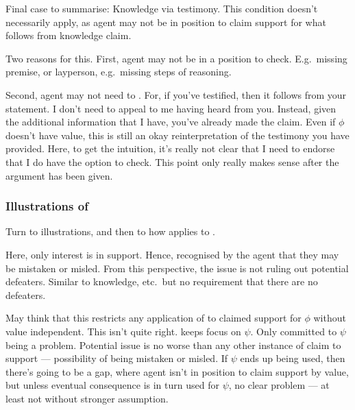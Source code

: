 \begin{note}
  Final case to summarise:
  Knowledge via testimony.
  This condition doesn't necessarily apply, as agent may not be in position to claim support for what follows from knowledge claim.

  Two reasons for this.
  First, agent may not be in a position to check.
  E.g.\ missing premise, or layperson, e.g.\ missing steps of reasoning.

  Second, agent may not need to \RBV{-}.
  For, if you've testified, then it follows from your statement.
  I don't need to appeal to me having heard from you.
  Instead, given the additional information that I have, you've already made the claim.
  Even if \(\phi\) doesn't have value, this is still an okay reinterpretation of the testimony you have provided.
  Here, to get the intuition, it's really not clear that I need to endorse that I do have the option to check.
  {
    \color{red}
    This point only really makes sense after the argument has been given.
  }
\end{note}

\subsubsection{Illustrations of \nI{}}
\label{sec:illustrations-ni}

\begin{note}
  Turn to illustrations, and then to how \nI{} applies to \gsi{}.
\end{note}

\begin{note}
  Here, only interest is in support.
  Hence, recognised by the agent that they may be mistaken or misled.
  From this perspective, the issue is not ruling out potential defeaters.
  Similar to knowledge, etc.\ but no requirement that there are no defeaters.
\end{note}

\begin{note}
  May think that this restricts any application of \RBV{} to claimed support for \(\phi\) without value independent.
  This isn't quite right.
  \eiS{} keeps focus on \(\psi\).
  Only committed to \(\psi\) being a problem.
  Potential issue is no worse than any other instance of claim to support --- possibility of being mistaken or misled.
  If \(\psi\) ends up being used, then there's going to be a gap, where agent isn't in position to claim support by value, but unless eventual consequence is in turn used for \(\psi\), no clear problem --- at least not without stronger assumption.
\end{note}

